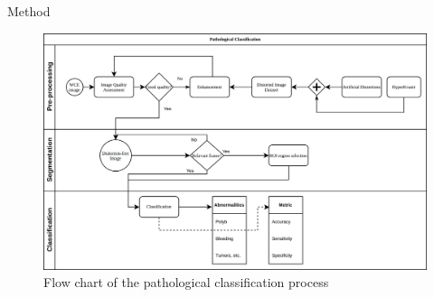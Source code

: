 \documentclass{libs/ufc_format}
\newcommand{\tikzmark}[1]{\tikz[overlay,remember picture] \node (#1) {};}
\begin{document}






\begin{frame}{Method}
    \begin{figure}
        \centering
        \includegraphics[scale=0.08]{libs/algorithm.png}
        \caption{ Flow chart of the pathological classification process}
        \label{fig:al}
    \end{figure}
\end{frame}
\end{document}
